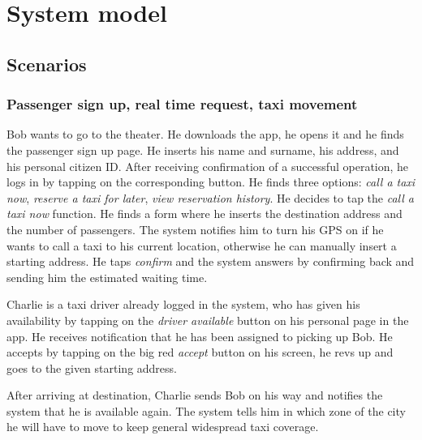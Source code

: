 \chapter{System model}

\section{Scenarios}

\subsection{Passenger sign up, real time request, taxi movement}
Bob wants to go to the theater. He downloads the \mts{} app, he opens it and he finds the passenger sign up page. He inserts his name and surname, his address, and his personal citizen ID. After receiving confirmation of a successful operation, he logs in by tapping on the corresponding button. He finds three options: \emph{call a taxi now}, \emph{reserve a taxi for later}, \emph{view reservation history}. He decides to tap the \emph{call a taxi now} function. He finds a form where he inserts the destination address and the number of passengers. The system notifies him to turn his GPS on if he wants to call a taxi to his current location, otherwise he can manually insert a starting address. He taps \emph{confirm} and the system answers by confirming back and sending him the estimated waiting time.

Charlie is a taxi driver already logged in the system, who has given his availability by tapping on the \emph{driver available} button on his personal page in the app. He receives notification that he has been assigned to picking up Bob. He accepts by tapping on the big red \emph{accept} button on his screen, he revs up and goes to the given starting address.

After arriving at destination, Charlie sends Bob on his way and notifies the system that he is available again. The system tells him in which zone of the city he will have to move to keep general widespread taxi coverage.

